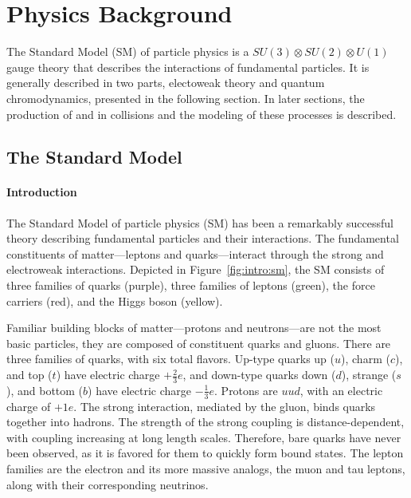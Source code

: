 \chapter{Physics Background}\label{ch:sm}
The Standard Model (SM) of particle physics is a $SU(3)\otimes SU(2)\otimes U(1)$ gauge theory that describes the interactions of fundamental particles. It is generally described in two parts, electoweak theory and quantum chromodynamics, presented in the following section. In later sections, the production of \W and \Z in \pp collisions and the modeling of these processes is described. 



\section{The Standard Model}\label{ch:sm:sm}
\subsubsection{Introduction}
The Standard Model of particle physics (SM) has been a remarkably successful theory describing fundamental particles and their interactions. The fundamental constituents of matter---leptons and quarks---interact through the strong and electroweak interactions. Depicted in Figure~\ref{fig:intro:sm}, the SM consists of three families of quarks (purple), three families of leptons (green), the force carriers (red), and the Higgs boson (yellow). 



Familiar building blocks of matter---protons and neutrons---are not the most basic particles, they are composed of constituent quarks and gluons. There are three families of quarks, with six total flavors. Up-type quarks up ($u$), charm ($c$), and top ($t$) have electric charge $+\frac{2}{3} e$, and down-type quarks down ($d$), strange ($s$), and bottom ($b$) have electric charge $-\frac{1}{3}e$. Protons are $uud$, with an electric charge of $+1e$. The strong interaction, mediated by the gluon, binds quarks together into hadrons. The strength of the strong coupling is distance-dependent, with coupling increasing at long length scales. Therefore, bare quarks have never been observed, as it is favored for them to quickly form bound states. The lepton families are the electron and its more massive analogs, the muon and tau leptons, along with their corresponding neutrinos. 

